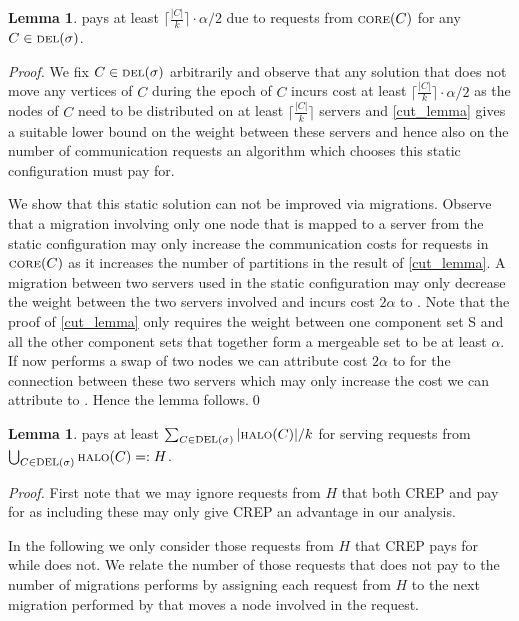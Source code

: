 \documentclass[a4paper,xcolor=dvipsnames, tikz, 12pt]{article}
\newcommand{\nl}{\newline}
\newcommand{\crep}{C{\scriptsize REP}}
\newcommand{\del}{\text{\scriptsize DEL}}
\newcommand{\opt}{\text{O{\scriptsize PT}}}
\newcommand{\core}{\text{\scriptsize CORE}}
\newcommand{\halo}{\text{\scriptsize HALO}}
\theoremstyle{definition}
\newtheorem{lemma}[defi]{Lemma}
\begin{document}
\begin{lemma}
	\opt{} pays at least $\lceil\frac{|C|}{k}\rceil\cdot\alpha/2$ due to requests from $\core(C)$ for any $C\in\del{}(\sigma)$.
\end{lemma}

\textit{Proof.} We fix $C\in\del{}(\sigma)$ arbitrarily and observe that any solution that does not move any vertices of $C$ during the epoch of $C$ incurs cost at least $\lceil\frac{|C|}{k}\rceil\cdot\alpha/2$ as the nodes of $C$ need to be distributed on at least $\lceil\frac{|C|}{k}\rceil$ servers and \cref{cut_lemma} gives a suitable lower bound on the weight between these servers and hence also on the number of communication requests an algorithm which chooses this static configuration must pay for.

We show that this static solution can not be improved via migrations. Observe that a migration involving only one node that is mapped to a server from the static configuration may only increase the communication costs for requests in $\core(C)$ as it increases the number of partitions in the result of \cref{cut_lemma}. A migration between two servers used in the static configuration may only decrease the weight between the two servers involved and incurs cost $2\alpha$ to \opt{}. Note that the proof of  \cref{cut_lemma} only requires the weight between one component set S and all the other component sets that together form a mergeable set to be at least $\alpha$. If \opt{} now performs a swap of two nodes we can attribute cost $2\alpha$ to \opt{} for the connection between these two servers which may only increase the cost we can attribute to \opt{}. Hence the lemma follows.\qed\nl

\begin{lemma}
	\opt{} pays at least $\sum_{C\in\del{}(\sigma)}|\halo(C)|/k$ for serving requests from\nl $\bigcup_{C\in\del{}(\sigma)}\halo(C)=:H$.
\end{lemma}

\textit{Proof.} First note that we may ignore requests from $H$ that both \crep{} and \opt{} pay for as including these may only give \crep{} an advantage in our analysis.

In the following we only consider those requests from $H$ that \crep{} pays for while \opt{} does not. We relate the number of those requests that \opt{} does not pay to the number of migrations \opt{} performs by assigning each request from $H$ to the next migration performed by \opt{} that moves a node involved in the request.
\end{document}
